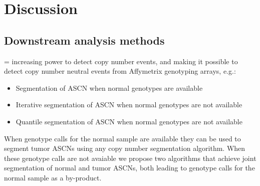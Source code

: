 \documentclass[10pt]{bmc_article}
\newenvironment{bmcformat}{\fussy\setboolean{publ}{true}}{\fussy}
\begin{document}
\begin{bmcformat}
\begin{center}
 \label{figROCs,chr18}
\end{center}



\section*{Discussion}
\label{sec:discussion}

\subsection*{Downstream analysis methods}
= increasing power to detect copy number events, and making it possible to detect copy number neutral events from Affymetrix genotyping arrays, e.g.: 
\begin{itemize}
\item Segmentation of ASCN when normal genotypes are available
\item Iterative segmentation of ASCN when normal genotypes are not available
\item Quantile segmentation of ASCN when normal genotypes are not available
\end{itemize}

 When genotype calls for the normal sample are available they can be used to segment tumor ASCNs using any copy number segmentation algorithm. When these genotype calls are not avaiable we propose two algorithms that achieve joint segmentation of normal and tumor ASCNs, both leading to genotype calls for the normal sample as a by-product.\\


\end{bmcformat}
\end{document}
